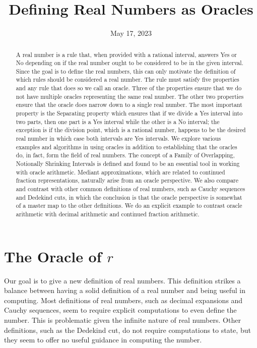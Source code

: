 \documentclass[12pt]{article}
\title{Defining Real Numbers as Oracles}
\date{May 17, 2023}
\begin{document}
\maketitle
\begin{abstract}
A real number is a rule that, when provided with a rational interval, answers Yes or No depending on if the real number ought to be considered to be in the given interval. Since the goal is to define the real numbers, this can only motivate the definition of which rules should be considered a real number. The rule must satisfy five properties and any rule that does so we call an oracle. Three of the properties ensure that we do not have multiple oracles representing the same real number. The other two properties ensure that the oracle does narrow down to a single real number. The most important property is the Separating property which ensures that if we divide a Yes interval into two parts, then one part is a Yes interval while the other is a No interval; the exception is if the division point, which is a rational number, happens to be the desired real number in which case both intervals are Yes intervals. We explore various examples and algorithms in using oracles in addition to establishing that the oracles do, in fact, form the field of real numbers. The concept of a Family of Overlapping, Notionally Shrinking Intervals is defined and found to be an essential tool in working with oracle arithmetic. Mediant approximations, which are related to continued fraction representations, naturally arise from an oracle perspective. We also compare and contrast with other common definitions of real numbers, such as Cauchy sequences and Dedekind cuts, in which the conclusion is that the oracle perspective is somewhat of a master map to the other definitions. We do an explicit example to contrast oracle arithmetic with decimal arithmetic and continued fraction arithmetic. 
\end{abstract}

\tableofcontents

\section{The Oracle of \texorpdfstring{$r$}{r}}\label{sec:ora}

Our goal is to give a new definition of real numbers. This definition strikes a balance between having a solid definition of a real number and being useful in computing. Most definitions of real numbers, such as decimal expansions and Cauchy sequences, seem to require explicit computations to even define the number. This is problematic given the infinite nature of real numbers. Other definitions, such as the Dedekind cut, do not require computations to state, but they seem to offer no useful guidance in computing the number. 
\end{document}
